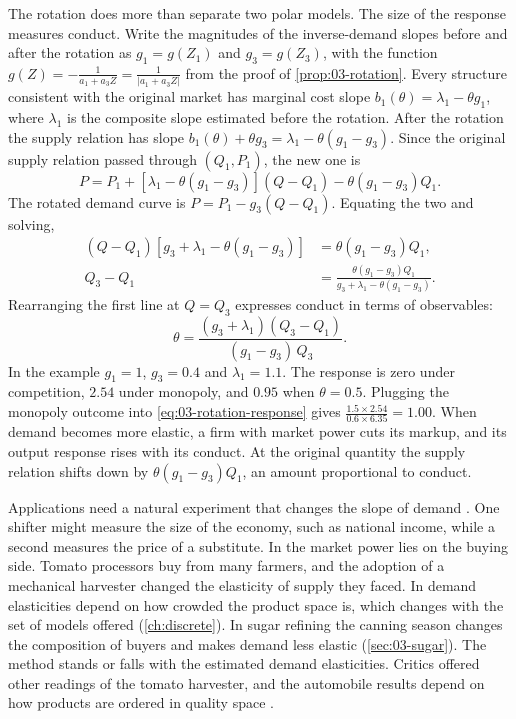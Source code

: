 The rotation does more than separate two polar models. The size of the response measures conduct. Write the magnitudes of
the inverse-demand slopes before and after the rotation as $g_1 = g(Z_1)$ and $g_3 = g(Z_3)$, with the function
$g(Z) = -\frac{1}{a_1 + a_3 Z} = \frac{1}{\lvert a_1 + a_3 Z\rvert}$ from the proof of \cref{prop:03-rotation}.
Every structure consistent with the original market has marginal cost slope $b_1(\theta) = \lambda_1 - \theta g_1$, where
$\lambda_1$ is the composite slope estimated before the rotation. After the rotation the supply relation has slope
$b_1(\theta) + \theta g_3 = \lambda_1 - \theta(g_1 - g_3)$. Since the original supply relation passed through $(Q_1, P_1)$,
the new one is
\begin{equation*}
P = P_1 + \left[\lambda_1 - \theta(g_1 - g_3)\right](Q - Q_1) - \theta(g_1 - g_3) Q_1 .
\end{equation*}
The rotated demand curve is $P = P_1 - g_3(Q - Q_1)$. Equating the two and solving,
\begin{align*}
(Q - Q_1)\left[g_3 + \lambda_1 - \theta(g_1 - g_3)\right] &= \theta(g_1 - g_3) Q_1 ,\\
Q_3 - Q_1 &= \frac{\theta(g_1 - g_3)Q_1}{g_3 + \lambda_1 - \theta(g_1 - g_3)} .
\end{align*}
Rearranging the first line at $Q = Q_3$ expresses conduct in terms of observables:
\begin{equation}\label{eq:03-rotation-response}
\theta = \frac{(g_3 + \lambda_1)(Q_3 - Q_1)}{(g_1 - g_3)\, Q_3} .
\end{equation}
In the example $g_1 = 1$, $g_3 = 0.4$ and $\lambda_1 = 1.1$. The response is zero under competition, $2.54$ under
monopoly, and $0.95$ when $\theta = 0.5$. Plugging the monopoly outcome into \eqref{eq:03-rotation-response} gives
$\frac{1.5 \times 2.54}{0.6 \times 6.35} = 1.00$. When demand becomes more elastic, a firm with market power cuts its
markup, and its output response rises with its conduct. At the original quantity the supply relation shifts down by
$\theta(g_1 - g_3)Q_1$, an amount proportional to conduct.

Applications need a natural experiment that changes the slope of demand \citep[pp.~1033--1034]{Bresnahan1989}. One
shifter might measure the size of the economy, such as national income, while a second measures the price of a
substitute. In \citet{JustChern1980} the market power lies on the buying side. Tomato processors buy from many farmers,
and the adoption of a mechanical harvester changed the elasticity of supply they faced. In
\citet{Bresnahan1981,Bresnahan1987} demand elasticities depend on how crowded the product space is, which changes with
the set of models offered (\cref{ch:discrete}). In sugar refining the canning season changes the composition of buyers
and makes demand less elastic (\cref{sec:03-sugar}). The method stands or falls with the estimated demand elasticities.
Critics offered other readings of the tomato harvester, and the automobile results depend on how products are ordered in
quality space \citep[p.~1034]{Bresnahan1989}.

